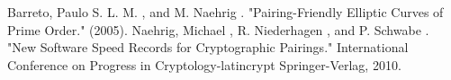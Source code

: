 \documentclass[a4paper,10pt]{article}
\begin{document}
\begin{thebibliography}{99}

   Barreto, Paulo S. L. M. , and M. Naehrig . "Pairing-Friendly Elliptic Curves of Prime Order." (2005).
   Naehrig, Michael , R. Niederhagen , and P. Schwabe . "New Software Speed Records for Cryptographic Pairings." International Conference on Progress in Cryptology-latincrypt Springer-Verlag, 2010.
\end{thebibliography}
\end{document}
